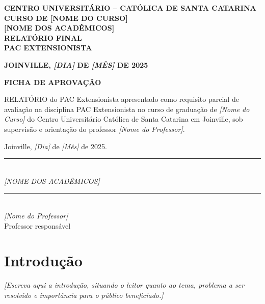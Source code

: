 \documentclass[12pt,a4paper]{article}
\begin{document}
\begin{titlepage}
    \begin{center}
        \textbf{CENTRO UNIVERSITÁRIO – CATÓLICA DE SANTA CATARINA} \\
        \textbf{CURSO DE [NOME DO CURSO]} \\[4cm]
        
        \textbf{[NOME DOS ACADÊMICOS]} \\[4cm]
        
        \textbf{\large RELATÓRIO FINAL \\ PAC EXTENSIONISTA} \\
        \vfill
        
        \textbf{JOINVILLE, \textit{[DIA]} DE \textit{[MÊS]} DE 2025}
    \end{center}
\end{titlepage}

\newpage
\begin{center}
    \textbf{FICHA DE APROVAÇÃO} \\[2cm]
\end{center}

\noindent RELATÓRIO do PAC Extensionista apresentado como requisito parcial de avaliação na disciplina PAC Extensionista no curso de graduação de \textit{[Nome do Curso]} do Centro Universitário Católica de Santa Catarina em Joinville, sob supervisão e orientação do professor \textit{[Nome do Professor]}.\par\vspace{2cm}

\begin{center}
    Joinville, \textit{[Dia]} de \textit{[Mês]} de 2025. \\[2cm]
    
    \rule{10cm}{0.5pt} \\
    \textit{[NOME DOS ACADÊMICOS]} \\[2cm]
    
    \rule{10cm}{0.5pt} \\
    \textit{[Nome do Professor]} \\
    Professor responsável
\end{center}

\newpage
\tableofcontents

\newpage

\section{Introdução}
\textit{[Escreva aqui a introdução, situando o leitor quanto ao tema, problema a ser resolvido e importância para o público beneficiado.]}
\end{document}
